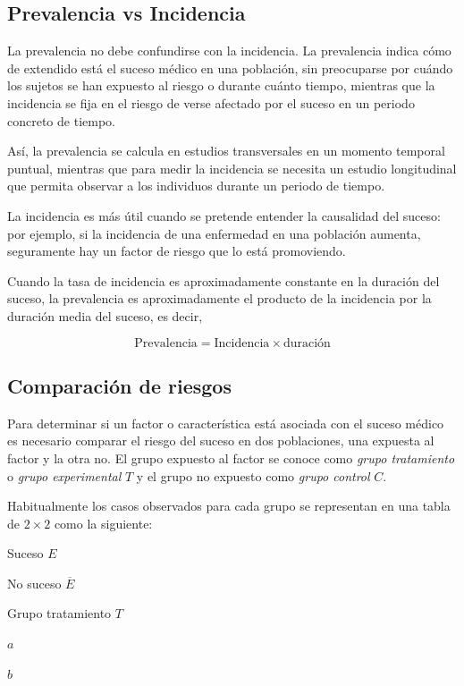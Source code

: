 \documentclass[
  a4paper,
]{scrreport}
\theoremstyle{plain}
\theoremstyle{definition}
\theoremstyle{definition}
\theoremstyle{remark}
\begin{document}
\subsection{Prevalencia vs Incidencia}\label{prevalencia-vs-incidencia}

La prevalencia no debe confundirse con la incidencia. La prevalencia
indica cómo de extendido está el suceso médico en una población, sin
preocuparse por cuándo los sujetos se han expuesto al riesgo o durante
cuánto tiempo, mientras que la incidencia se fija en el riesgo de verse
afectado por el suceso en un periodo concreto de tiempo.

Así, la prevalencia se calcula en estudios transversales en un momento
temporal puntual, mientras que para medir la incidencia se necesita un
estudio longitudinal que permita observar a los individuos durante un
periodo de tiempo.

La incidencia es más útil cuando se pretende entender la causalidad del
suceso: por ejemplo, si la incidencia de una enfermedad en una población
aumenta, seguramente hay un factor de riesgo que lo está promoviendo.

Cuando la tasa de incidencia es aproximadamente constante en la duración
del suceso, la prevalencia es aproximadamente el producto de la
incidencia por la duración media del suceso, es decir,

\[ \mbox{Prevalencia} = \mbox{Incidencia} \times \mbox{duración}\]

\subsection{Comparación de riesgos}\label{comparaciuxf3n-de-riesgos}

Para determinar si un factor o característica está asociada con el
suceso médico es necesario comparar el riesgo del suceso en dos
poblaciones, una expuesta al factor y la otra no. El grupo expuesto al
factor se conoce como \emph{grupo tratamiento} o \emph{grupo
experimental} \(T\) y el grupo no expuesto como \emph{grupo control}
\(C\).

Habitualmente los casos observados para cada grupo se representan en una
tabla de \(2\times2\) como la siguiente:

Suceso \(E\)

No suceso \(\overline E\)

Grupo tratamiento \(T\)

\(a\)

\(b\)
\end{document}

